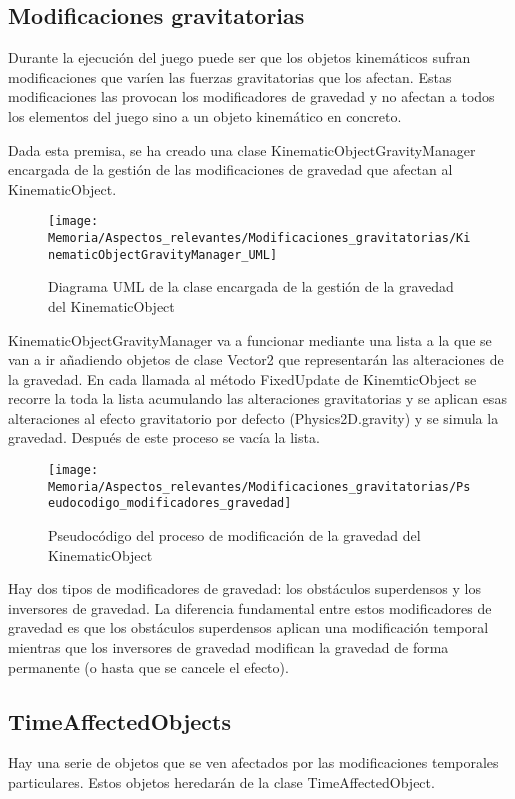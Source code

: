 \subsection{Modificaciones gravitatorias}
Durante la ejecución del juego puede ser que los objetos kinemáticos sufran modificaciones que varíen las fuerzas gravitatorias que los afectan. Estas modificaciones las provocan los modificadores de gravedad y no afectan a todos los elementos del juego sino a un objeto kinemático en concreto.

Dada esta premisa, se ha creado una clase KinematicObjectGravityManager encargada de la gestión de las modificaciones de gravedad que afectan al KinematicObject.

\begin{figure}[h]
\centering
\texttt{[image: Memoria/Aspectos\_relevantes/Modificaciones\_gravitatorias/KinematicObjectGravityManager\_UML]}
\caption{Diagrama UML de la clase encargada de la gestión de la gravedad del KinematicObject}
\end{figure}

KinematicObjectGravityManager va a funcionar mediante una lista a la que se van a ir añadiendo objetos de clase Vector2 que representarán las alteraciones de la gravedad. En cada llamada al método FixedUpdate de KinemticObject se recorre la toda la lista acumulando las alteraciones gravitatorias y se aplican esas alteraciones al efecto gravitatorio por defecto (Physics2D.gravity) y se simula la gravedad. Después de este proceso se vacía la lista.

\begin{figure}[h]
\centering
\texttt{[image: Memoria/Aspectos\_relevantes/Modificaciones\_gravitatorias/Pseudocodigo\_modificadores\_gravedad]}
\caption{Pseudocódigo del proceso de modificación de la gravedad del KinematicObject}
\end{figure}

Hay dos tipos de modificadores de gravedad: los obstáculos superdensos y los inversores de gravedad. La diferencia fundamental entre estos modificadores de gravedad es que los obstáculos superdensos aplican una modificación temporal mientras que los inversores de gravedad modifican la gravedad de forma permanente (o hasta que se cancele el efecto).

\subsection{TimeAffectedObjects}
Hay una serie de objetos que se ven afectados por las modificaciones temporales particulares. Estos objetos heredarán de la clase TimeAffectedObject. 

